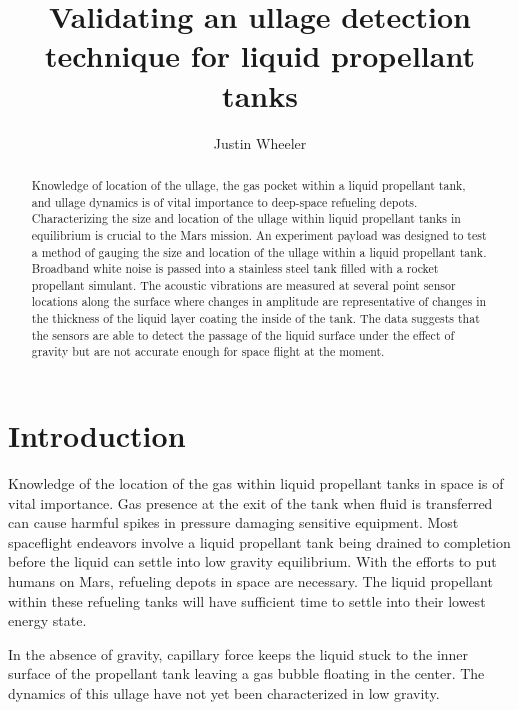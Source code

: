 \documentclass[reprint,amsmath,amssymb,aps,prb,nofootinbib,floatfix]{revtex4-2}
\begin{document}
 

\vspace*{25pt}
\title{Validating an ullage detection technique for liquid propellant tanks }
\author{ Justin Wheeler }
\begin{abstract}
Knowledge of location of the ullage, the gas pocket within a liquid propellant tank, and ullage dynamics is of vital importance to deep-space refueling depots. Characterizing the size and location of the ullage within liquid propellant tanks in equilibrium is crucial to the Mars mission. An experiment payload was designed to test a method of gauging the size and location of the ullage within a liquid propellant tank. Broadband white noise is passed into a stainless steel tank filled with a rocket propellant simulant. The acoustic vibrations are measured at several point sensor locations along the surface where changes in amplitude are representative of changes in the thickness of the liquid layer coating the inside of the tank. The data suggests that the sensors are able to detect the passage of the liquid surface under the effect of gravity but are not accurate  enough for space flight at the moment.
\end{abstract}
\maketitle


\section{Introduction}

Knowledge of the location of the gas within liquid propellant tanks in space is of vital importance. Gas presence at the exit of the tank when fluid is transferred can cause harmful spikes in pressure damaging sensitive equipment. Most spaceflight endeavors involve a liquid propellant tank being drained to completion before the liquid can settle into low gravity equilibrium. With the efforts to put humans on Mars, refueling depots in space are necessary. The liquid propellant within these refueling tanks will have sufficient time to settle into their lowest energy state.

In the absence of gravity, capillary force keeps the liquid stuck to the inner surface of the propellant tank leaving a gas bubble floating in the center. The dynamics of this ullage have not yet been characterized in low gravity. 
\end{document}
